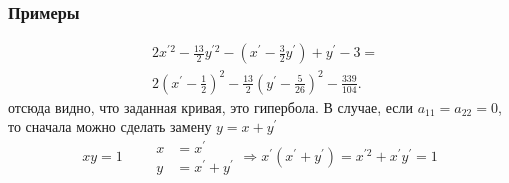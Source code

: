\documentclass[10pt]{beamer}
\begin{document}
    \begin{frame}
        \frametitle{Примеры}
        \begin{equation*}
            \begin{aligned}
                & 2x^{\prime 2} - \frac{13}{2} y^{\prime 2} - \left(x^\prime - \frac{3}{2}y^\prime\right) + y^\prime - 3 = \\
                & 2 \left(x^\prime - \frac{1}{2} \right)^2 - \frac{13}{2}\left(y^\prime - \frac{5}{26}\right)^2-\frac{339}{104}.
            \end{aligned}
        \end{equation*}
        отсюда видно, что заданная кривая, это гипербола.
        В случае, если $a_{11} = a_{22} = 0$, то сначала можно сделать замену $y = x + y^\prime$
        \begin{equation*}
            xy = 1
            \qquad
            \begin{aligned}
                x & = x^\prime \\
                y & = x^\prime + y^\prime
            \end{aligned}
            \Longrightarrow 
            x^\prime (x^\prime + y^\prime) = x^{\prime 2} +  x^\prime y^\prime = 1
        \end{equation*}
    \end{frame}
\end{document}
